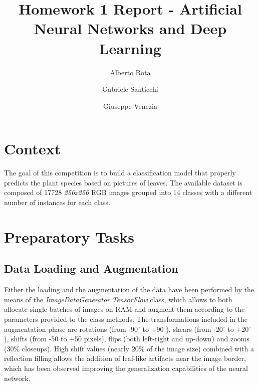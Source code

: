 \documentclass[conference]{IEEEtran}
\begin{document}
\title{Homework 1 Report - Artificial Neural Networks and Deep Learning}

\author{
Alberto Rota
\and
Gabriele Santicchi 
\and
Giuseppe Venezia 
}

\maketitle
\section{Context}
    The goal of this competition is to build a classification model that properly 
    predicts the plant species based on pictures of leaves. The available dataset is
    composed of 17728 \textit{256x256} RGB images grouped into 14 classes with a different 
    number of instances for each class. 
\section{Preparatory Tasks}
\subsection{Data Loading and Augmentation}
    Either the loading and the augmentation of the data have been performed by
    the means of the \textit{ImageDataGenerator} \textit{TensorFlow} class, which allows
    to both allocate single batches of images on RAM and augment them according
    to the parameters provided to the class methods. The transformations included
    in the augmentation phase are rotations (from -90$^{\circ}$ to
    +90$^{\circ}$), shears (from -20$^{\circ}$ to +20$^{\circ}$ ), shifts (from
    -50 to +50 pixels), flips (both left-right and up-down) and zooms (30\%
    closeups). High shift values (nearly 20\% of the image size) combined with
    a reflection filling allows the addition of leaf-like artifacts near the
    image border, which has been observed improving the generalization
    capabilities of the neural network.  
\end{document}
